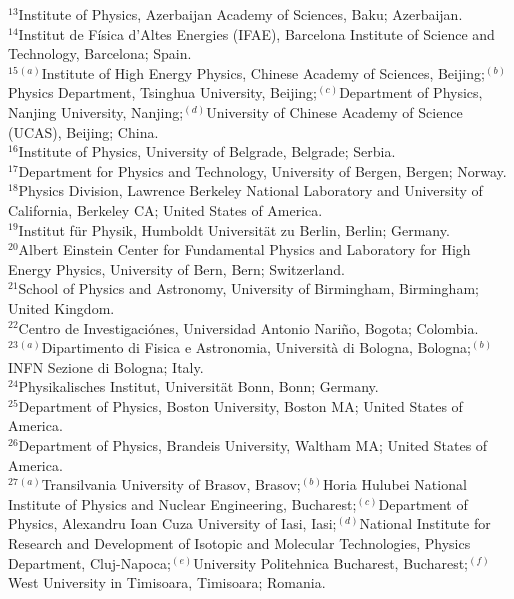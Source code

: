 \begin{flushleft}
$^{13}$Institute of Physics, Azerbaijan Academy of Sciences, Baku; Azerbaijan.\\
$^{14}$Institut de F\'isica d'Altes Energies (IFAE), Barcelona Institute of Science and Technology, Barcelona; Spain.\\
$^{15}$$^{(a)}$Institute of High Energy Physics, Chinese Academy of Sciences, Beijing;$^{(b)}$Physics Department, Tsinghua University, Beijing;$^{(c)}$Department of Physics, Nanjing University, Nanjing;$^{(d)}$University of Chinese Academy of Science (UCAS), Beijing; China.\\
$^{16}$Institute of Physics, University of Belgrade, Belgrade; Serbia.\\
$^{17}$Department for Physics and Technology, University of Bergen, Bergen; Norway.\\
$^{18}$Physics Division, Lawrence Berkeley National Laboratory and University of California, Berkeley CA; United States of America.\\
$^{19}$Institut f\"{u}r Physik, Humboldt Universit\"{a}t zu Berlin, Berlin; Germany.\\
$^{20}$Albert Einstein Center for Fundamental Physics and Laboratory for High Energy Physics, University of Bern, Bern; Switzerland.\\
$^{21}$School of Physics and Astronomy, University of Birmingham, Birmingham; United Kingdom.\\
$^{22}$Centro de Investigaci\'ones, Universidad Antonio Nari\~no, Bogota; Colombia.\\
$^{23}$$^{(a)}$Dipartimento di Fisica e Astronomia, Universit\`a di Bologna, Bologna;$^{(b)}$INFN Sezione di Bologna; Italy.\\
$^{24}$Physikalisches Institut, Universit\"{a}t Bonn, Bonn; Germany.\\
$^{25}$Department of Physics, Boston University, Boston MA; United States of America.\\
$^{26}$Department of Physics, Brandeis University, Waltham MA; United States of America.\\
$^{27}$$^{(a)}$Transilvania University of Brasov, Brasov;$^{(b)}$Horia Hulubei National Institute of Physics and Nuclear Engineering, Bucharest;$^{(c)}$Department of Physics, Alexandru Ioan Cuza University of Iasi, Iasi;$^{(d)}$National Institute for Research and Development of Isotopic and Molecular Technologies, Physics Department, Cluj-Napoca;$^{(e)}$University Politehnica Bucharest, Bucharest;$^{(f)}$West University in Timisoara, Timisoara; Romania.\\
$$
\end{flushleft}

